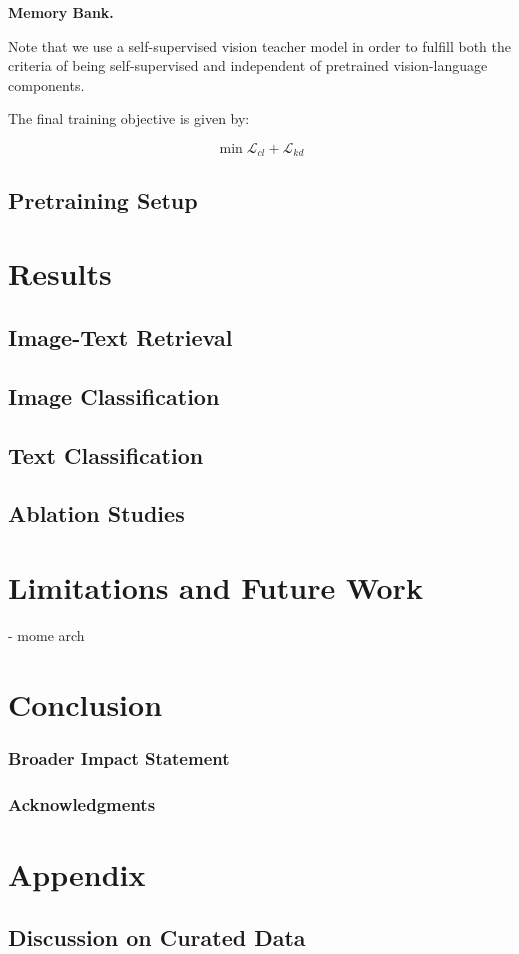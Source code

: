 \documentclass[10pt]{article} %
\begin{document}
\textbf{Memory Bank.}

Note that we use a self-supervised vision teacher model in order to fulfill both the criteria of
being self-supervised and independent of pretrained vision-language components.

The final training objective is given by:

\[
\min \mathcal{L}_{cl} + \mathcal{L}_{kd}
\]

\subsection{Pretraining Setup}

\section{Results}
\subsection{Image-Text Retrieval}
\subsection{Image Classification}
\subsection{Text Classification}
\subsection{Ablation Studies}
\section{Limitations and Future Work}
- mome arch
\section{Conclusion}


\subsubsection*{Broader Impact Statement}




\subsubsection*{Acknowledgments}





\appendix
\section{Appendix}
\subsection{Discussion on Curated Data} \label{curated_data}
\end{document}
